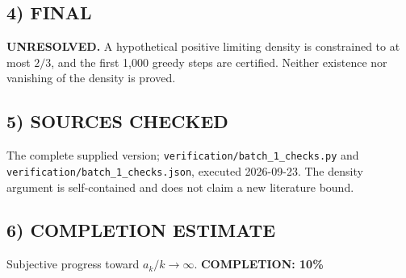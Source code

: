 \subsection*{4) FINAL}
\textbf{UNRESOLVED.} A hypothetical positive limiting density is constrained to at most $2/3$, and the first 1,000 greedy steps are certified. Neither existence nor vanishing of the density is proved.
\subsection*{5) SOURCES CHECKED}
The complete supplied version; \texttt{verification/batch\_1\_checks.py} and \texttt{verification/batch\_1\_checks.json}, executed 2026-09-23. The density argument is self-contained and does not claim a new literature bound.
\subsection*{6) COMPLETION ESTIMATE}
Subjective progress toward $a_k/k\to\infty$.
\textbf{COMPLETION: 10\%}
